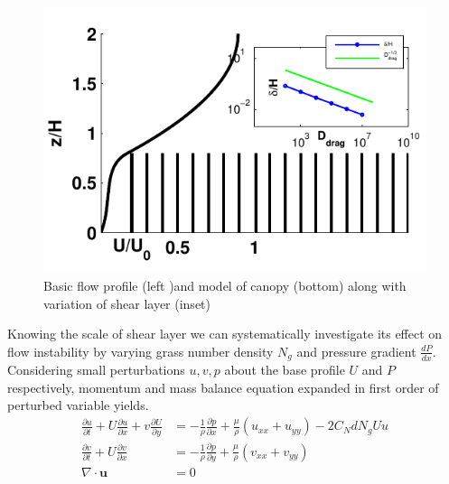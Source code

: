 \documentclass[aps,twocolumn,floatfix,prl,10pt]{revtex4-1}
\newcommand{\bu}{\mathbf{u}}
\newcommand{\del}{\partial}
\begin{document}
\begin{figure}[htb!]
  \includegraphics[]{fig1}
\caption{Basic flow profile (left )and model of canopy (bottom) along with variation of shear layer (inset) }
\end{figure}
Knowing the scale of shear layer we can systematically investigate its effect on flow instability
by varying grass number density $N_g$ and pressure gradient $\frac{dP}{dx}$. Considering small perturbations $u, v, p$ about the base profile $U$ and $P$
respectively, momentum and mass balance equation expanded in first order of perturbed variable yields.
\begin{equation}
\begin{split}
 \frac{\del u}{\del t}+U\frac{\del u}{\del x}+v\frac{\del U}{\del y} &= -\frac{1}{\rho}\frac{\del p}{\del x}+\frac{\mu}{\rho}(u_{xx}+u_{yy})-2C_{N}dN_{g}Uu\\
 \frac{\del v}{\del  t}+ U\frac{\del v}{\del x} &= -\frac{1}{\rho}\frac{\del p}{\del y}+\frac{\mu}{\rho}(v_{xx}+v_{yy})\\
 \nabla\cdot \bu &= 0
\end{split}
\end{equation}
\end{document}
